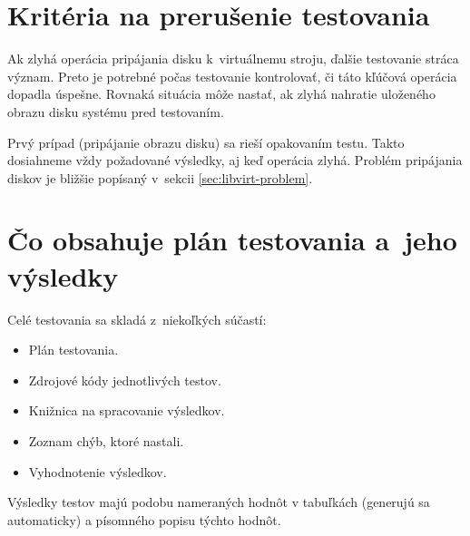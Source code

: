 \section{Kritéria na prerušenie testovania}

Ak zlyhá operácia pripájania disku k~virtuálnemu stroju, ďalšie testovanie
stráca význam. Preto je potrebné počas testovanie kontrolovať, či táto kľúčová
operácia dopadla úspešne. Rovnaká situácia môže nastať, ak zlyhá nahratie
uloženého obrazu disku systému pred testovaním.

Prvý prípad (pripájanie obrazu disku) sa rieší opakovaním testu. Takto
dosiahneme vždy požadované výsledky, aj keď operácia zlyhá. Problém pripájania
diskov je bližšie popísaný v~sekcii \ref{sec:libvirt-problem}.

\section{Čo obsahuje plán testovania a~jeho výsledky}

Celé testovania sa skladá z~niekoľkých súčastí:

\begin{itemize}
    \item Plán testovania.
    \item Zdrojové kódy jednotlivých testov.
    \item Knižnica na spracovanie výsledkov.
    \item Zoznam chýb, ktoré nastali.
    \item Vyhodnotenie výsledkov.
\end{itemize}

Výsledky testov majú podobu nameraných hodnôt v tabuľkách (generujú sa
automaticky) a písomného popisu týchto hodnôt.

